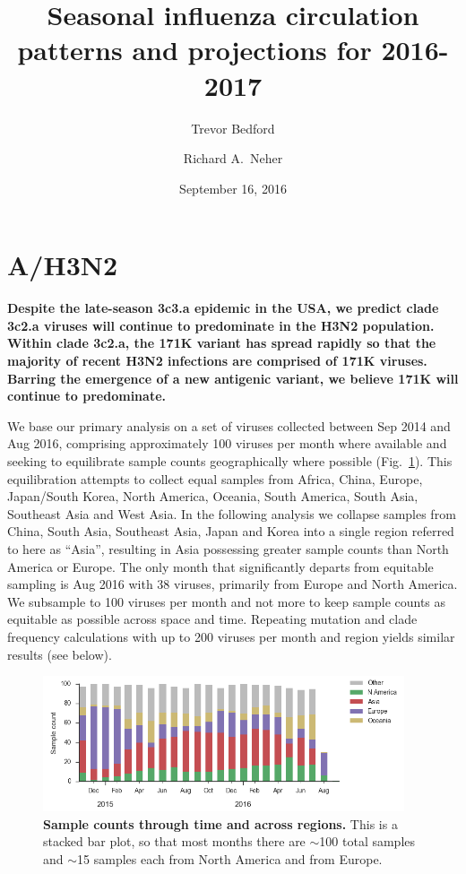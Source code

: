 \documentclass[11pt,oneside,letterpaper]{article}
\title{\vspace{2cm} \LARGE \bf
Seasonal influenza circulation patterns and projections for 2016-2017
}
\author[1]{Trevor Bedford}
\author[2]{Richard A.\ Neher}
\affil[1]{Vaccine and Infectious Disease Division, Fred Hutchinson Cancer Research Center, Seattle, WA, USA}
\affil[2]{Max Planck Institute for Developmental Biology, T\"ubingen, Germany}
\date{September 16, 2016}
\begin{document}
\maketitle

\tableofcontents

\pagebreak

\section*{A/H3N2}

\textbf{Despite the late-season 3c3.a epidemic in the USA, we predict clade 3c2.a viruses will continue to predominate in the H3N2 population. Within clade 3c2.a, the 171K variant has spread rapidly so that the majority of recent H3N2 infections are comprised of 171K viruses. Barring the emergence of a new antigenic variant, we believe 171K will continue to predominate.}

We base our primary analysis on a set of viruses collected between Sep 2014 and Aug 2016, comprising approximately 100 viruses per month where available and seeking to equilibrate sample counts geographically where possible (Fig.\ \ref{H3N2_counts}). This equilibration attempts to collect equal samples from Africa, China, Europe, Japan/South Korea, North America, Oceania, South America, South Asia, Southeast Asia and West Asia. In the following analysis we collapse samples from China, South Asia, Southeast Asia, Japan and Korea into a single region referred to here as ``Asia'', resulting in Asia possessing greater sample counts than North America or Europe. The only month that significantly departs from equitable sampling is Aug 2016 with 38 viruses, primarily from Europe and North America. We subsample to 100 viruses per month and not more to keep sample counts as equitable as possible across space and time. Repeating mutation and clade frequency calculations with up to 200 viruses per month and region yields similar results (see below).

\begin{figure}[H]
	\centering
	\includegraphics[width=0.95\textwidth]{../figures/sep-2016/H3N2_counts.png}
	\caption{\textbf{Sample counts through time and across regions.}
	This is a stacked bar plot, so that most months there are $\sim$100 total samples and $\sim$15 samples each from North America and from Europe.
	}
	\label{H3N2_counts}
\end{figure}
\end{document}
